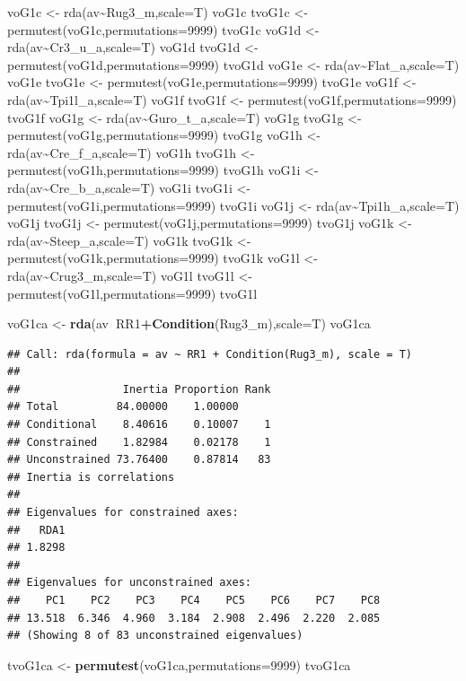 \documentclass[]{article}
\newenvironment{Shaded}{\begin{snugshade}}{\end{snugshade}}
\newcommand{\DataTypeTok}[1]{\textcolor[rgb]{0.13,0.29,0.53}{#1}}
\newcommand{\DecValTok}[1]{\textcolor[rgb]{0.00,0.00,0.81}{#1}}
\newcommand{\KeywordTok}[1]{\textcolor[rgb]{0.13,0.29,0.53}{\textbf{#1}}}
\newcommand{\NormalTok}[1]{#1}
\newcommand{\OperatorTok}[1]{\textcolor[rgb]{0.81,0.36,0.00}{\textbf{#1}}}
\newcommand{\StringTok}[1]{\textcolor[rgb]{0.31,0.60,0.02}{#1}}
\begin{document}
voG1c \textless{}- rda(av\textasciitilde{}Rug3\_m,scale=T) voG1c tvoG1c
\textless{}- permutest(voG1c,permutations=9999) tvoG1c voG1d
\textless{}- rda(av\textasciitilde{}Cr3\_u\_a,scale=T) voG1d tvoG1d
\textless{}- permutest(voG1d,permutations=9999) tvoG1d voG1e
\textless{}- rda(av\textasciitilde{}Flat\_a,scale=T) voG1e tvoG1e
\textless{}- permutest(voG1e,permutations=9999) tvoG1e voG1f
\textless{}- rda(av\textasciitilde{}Tpi1l\_a,scale=T) voG1f tvoG1f
\textless{}- permutest(voG1f,permutations=9999) tvoG1f voG1g
\textless{}- rda(av\textasciitilde{}Guro\_t\_a,scale=T) voG1g tvoG1g
\textless{}- permutest(voG1g,permutations=9999) tvoG1g voG1h
\textless{}- rda(av\textasciitilde{}Cre\_f\_a,scale=T) voG1h tvoG1h
\textless{}- permutest(voG1h,permutations=9999) tvoG1h voG1i
\textless{}- rda(av\textasciitilde{}Cre\_b\_a,scale=T) voG1i tvoG1i
\textless{}- permutest(voG1i,permutations=9999) tvoG1i voG1j
\textless{}- rda(av\textasciitilde{}Tpi1h\_a,scale=T) voG1j tvoG1j
\textless{}- permutest(voG1j,permutations=9999) tvoG1j voG1k
\textless{}- rda(av\textasciitilde{}Steep\_a,scale=T) voG1k tvoG1k
\textless{}- permutest(voG1k,permutations=9999) tvoG1k voG1l
\textless{}- rda(av\textasciitilde{}Crug3\_m,scale=T) voG1l tvoG1l
\textless{}- permutest(voG1l,permutations=9999) tvoG1l

\begin{Shaded}
\begin{Highlighting}[]
\NormalTok{voG1ca <-}\StringTok{ }\KeywordTok{rda}\NormalTok{(av}\OperatorTok{~}\NormalTok{RR1}\OperatorTok{+}\KeywordTok{Condition}\NormalTok{(Rug3_m),}\DataTypeTok{scale=}\NormalTok{T)}
\NormalTok{voG1ca}
\end{Highlighting}
\end{Shaded}

\begin{verbatim}
## Call: rda(formula = av ~ RR1 + Condition(Rug3_m), scale = T)
## 
##                Inertia Proportion Rank
## Total         84.00000    1.00000     
## Conditional    8.40616    0.10007    1
## Constrained    1.82984    0.02178    1
## Unconstrained 73.76400    0.87814   83
## Inertia is correlations 
## 
## Eigenvalues for constrained axes:
##   RDA1 
## 1.8298 
## 
## Eigenvalues for unconstrained axes:
##    PC1    PC2    PC3    PC4    PC5    PC6    PC7    PC8 
## 13.518  6.346  4.960  3.184  2.908  2.496  2.220  2.085 
## (Showing 8 of 83 unconstrained eigenvalues)
\end{verbatim}

\begin{Shaded}
\begin{Highlighting}[]
\NormalTok{tvoG1ca <-}\StringTok{ }\KeywordTok{permutest}\NormalTok{(voG1ca,}\DataTypeTok{permutations=}\DecValTok{9999}\NormalTok{)}
\NormalTok{tvoG1ca}
\end{Highlighting}
\end{Shaded}
\end{document}
